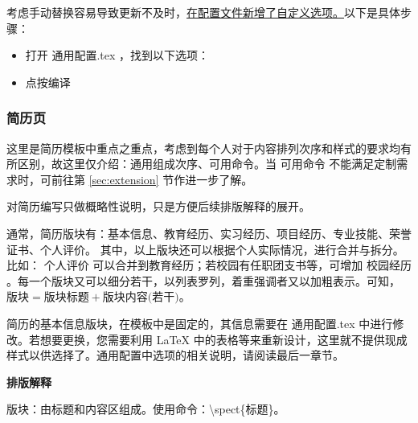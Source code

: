 \documentclass[a4paper,12pt]{ctexart}
\newenvironment{ul}{
	\begin{itemize}[topsep=0pt,labelsep=.5em,leftmargin=4.5em,itemsep=-.5em]
	}{\end{itemize}}
\newcommand{\fpic}[1]{
	\begin{figure}[!h]
		\centering
		\fbox{\texttt{[image: \#1]}}
	\end{figure}
}
\newcommand{\emp}[1]{
	\colorbox{spanbg}{#1}
}
\begin{document}
	考虑手动替换容易导致更新不及时，\underline{在配置文件新增了自定义选项。}以下是具体步骤：
	\begin{ul}
	\item 打开\emp{通用配置.tex}，找到以下选项：
	\begin{latexcode}
	\def\theCoverLetterCutomNeed{true} %
	\def\theCoverLetterAuthor{hazukie}  %
	\def\theCoverLetterDate{2025年8月8日}  
	\end{latexcode}
	
	\item 点按编译
	\end{ul}

	\subsubsection{简历页}
	这里是简历模板中重点之重点，考虑到每个人对于内容排列次序和样式的要求均有所区别，故这里仅介绍：通用组成次序、可用命令。当\emp{可用命令}不能满足定制需求时，可前往第 \ref{sec:extension} 节作进一步了解。
	
	对简历编写只做概略性说明，只是方便后续排版解释的展开。
	
	通常，简历版块有：基本信息、教育经历、实习经历、项目经历、专业技能、荣誉证书、个人评价。
	其中，以上版块还可以根据个人实际情况，进行合并与拆分。比如：\emp{个人评价}可以合并到教育经历；若校园有任职团支书等，可增加\emp{校园经历}。每一个版块又可以细分若干，以列表罗列，着重强调者又以加粗表示。可知，$\mbox{版块}=\mbox{版块标题}+\mbox{版块内容(若干)}$。
	
	简历的基本信息版块，在模板中是固定的，其信息需要在\emp{通用配置.tex}中进行修改。若想要更换，您需要利用 LaTeX 中的表格等来重新设计，这里就不提供现成样式以供选择了。通用配置中选项的相关说明，请阅读最后一章节。
	
	\noindent\textbf{排版解释}
	
	版块：由标题和内容区组成。使用命令：\textbackslash spect\{标题\}。
	\begin{latexcode}
	
	\end{latexcode}
	\fpic{spect.png}
	
\end{document}
